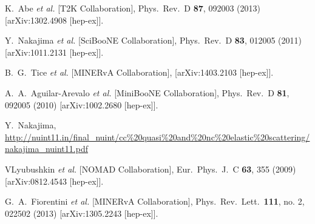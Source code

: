 \documentclass[%
reprint,
superscriptaddress,
 amsmath,amssymb,
 aps,
floatfix,
]{revtex4-1}
\begin{document}
\begin{thebibliography}{99}

  K.~Abe {\it et al.}  [T2K Collaboration],
  Phys.\ Rev.\ D {\bf 87}, 092003 (2013)
  [arXiv:1302.4908 [hep-ex]].

  Y.~Nakajima {\it et al.}  [SciBooNE Collaboration],
  Phys.\ Rev.\ D {\bf 83}, 012005 (2011)
  [arXiv:1011.2131 [hep-ex]].

  B.~G.~Tice {\it et al.}  [MINERvA Collaboration],
  [arXiv:1403.2103 [hep-ex]].


  A.~A.~Aguilar-Arevalo {\it et al.}  [MiniBooNE Collaboration],
  Phys.\ Rev.\ D {\bf 81}, 092005 (2010)
  [arXiv:1002.2680 [hep-ex]].

  Y.~Nakajima,
\url{http://nuint11.in/final\_nuint/cc\%20quasi\%20and\%20nc\%20elastic\%20scattering/nakajima\_nuint11.pdf}

  VLyubushkin {\it et al.}  [NOMAD Collaboration],
  Eur.\ Phys.\ J.\ C {\bf 63}, 355 (2009)
  [arXiv:0812.4543 [hep-ex]].


  G.~A.~Fiorentini {\it et al.}  [MINERvA Collaboration],
  Phys.\ Rev.\ Lett.\  {\bf 111}, no. 2, 022502 (2013)
  [arXiv:1305.2243 [hep-ex]].


\end{thebibliography}
\end{document}
